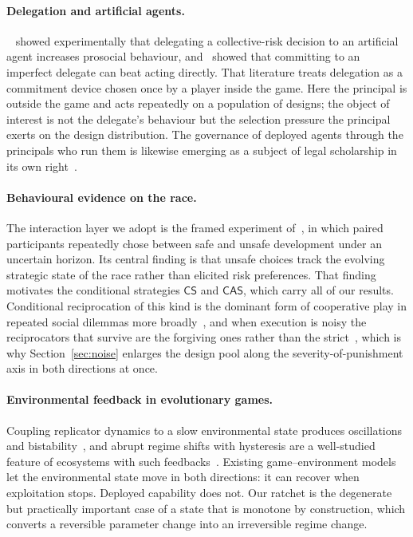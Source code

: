 \documentclass[11pt,a4paper]{article}
\theoremstyle{definition}
\newcommand{\CS}{\textsf{CS}}
\newcommand{\CAS}{\textsf{CAS}}
\begin{document}
\paragraph{Delegation and artificial agents.}~\citet{domingos2022delegation} showed experimentally that delegating a
collective-risk decision to an artificial agent increases prosocial behaviour,
and~\citet{terrucha2024committing} showed that committing to an imperfect
delegate can beat acting directly. That literature treats delegation as a
commitment device chosen once by a player inside the game. Here the principal
is outside the game and acts repeatedly on a population of designs; the object
of interest is not the delegate's behaviour but the selection pressure the
principal exerts on the design distribution. The governance of deployed agents
through the principals who run them is likewise emerging as a subject of legal
scholarship in its own right~\citep{kolt2025governing}.

\paragraph{Behavioural evidence on the race.}
The interaction layer we adopt is the framed experiment of~\citet{domingos2026falling}, in which paired participants repeatedly chose
between safe and unsafe development under an uncertain horizon. Its central
finding is that unsafe choices track the evolving strategic state of the race
rather than elicited risk preferences. That finding motivates the conditional
strategies $\CS$ and $\CAS$, which carry all of our results. Conditional
reciprocation of this kind is the dominant form of cooperative play in repeated
social dilemmas more broadly~\citep{axelrod1981evolution,nowak1993winstay,fischbacher2001conditionally,dalbo2018determinants},
and when execution is noisy the reciprocators that survive are the forgiving
ones rather than the strict~\citep{molander1985optimal,nowak1992tit,fudenberg2012slow},
which is why Section~\ref{sec:noise} enlarges the design pool along the
severity-of-punishment axis in both directions at once.

\paragraph{Environmental feedback in evolutionary games.}
Coupling replicator dynamics to a slow environmental state produces
oscillations and bistability~\citep{weitz2016oscillating,hauert2019asymmetric,tilman2020feedbacks}, and abrupt regime shifts
with hysteresis are a well-studied feature of ecosystems with such feedbacks~\citep{scheffer2001catastrophic}. Existing game--environment models let the
environmental state move in both directions: it can recover when exploitation
stops. Deployed capability does not. Our ratchet is the degenerate but practically important
case of a state that is monotone by construction, which converts a reversible
parameter change into an irreversible regime change.
\end{document}
